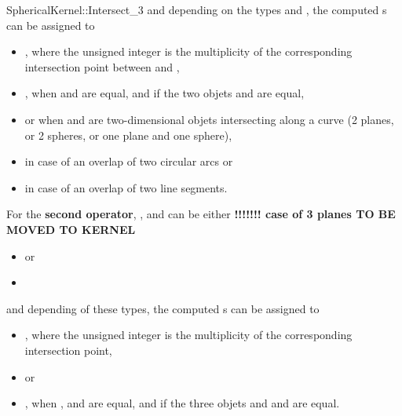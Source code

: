 \begin{ccRefFunctionObjectConcept}{SphericalKernel::Intersect_3}
and depending on the types  and , the computed 
s can be assigned to 
\begin{itemize}
\item {} ,
where the unsigned integer is the multiplicity of the corresponding
intersection point between  and ,
\item {} , when  and  are equal, and 
if the two objets  and  are equal,
\item {}  or  
when  and  are two-dimensional objets intersecting 
along a curve (2 planes, or 2 spheres, or one plane and one sphere),
\item {}  in case of an overlap of 
two circular arcs or
\item {}  in case of an overlap of two 
line segments. 
\end{itemize} 

For the \textbf{second operator}, ,  and 
can be either
\textbf{!!!!!!! case of 3 planes TO BE MOVED TO KERNEL}

\begin{itemize}
\item {}  or
\item {} 
\end{itemize}

and depending of these types, the computed s can be 
assigned to 
\begin{itemize}
\item {} ,
where the unsigned integer is the multiplicity of the corresponding
intersection point,
\item {}  or
\item {} , when ,  and  
are equal, and if the three objets  and  and 
are equal.
\end{itemize} 

\end{ccRefFunctionObjectConcept}
